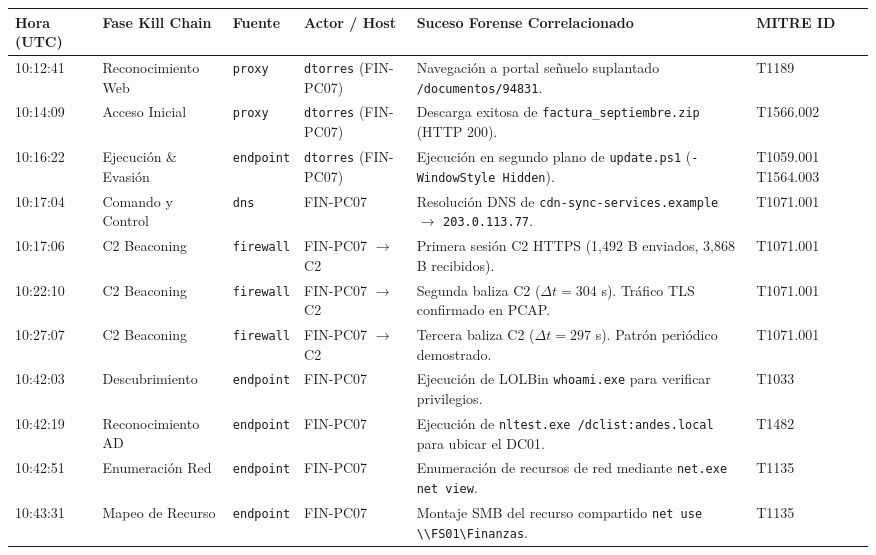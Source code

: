 \documentclass[11pt,a4paper]{article}
\begin{document}
\begin{table}[h!]
\centering
\small
\begin{tabularx}{\textwidth}{l p{2.2cm} l p{3.2cm} X l}
\toprule
\textbf{Hora (UTC)} & \textbf{Fase Kill Chain} & \textbf{Fuente} & \textbf{Actor / Host} & \textbf{Suceso Forense Correlacionado} & \textbf{MITRE ID} \\
\midrule
10:12:41 & Reconocimiento Web & \texttt{proxy} & \texttt{dtorres} (FIN-PC07) & Navegación a portal señuelo suplantado \texttt{/documentos/94831}. & T1189 \\
10:14:09 & Acceso Inicial & \texttt{proxy} & \texttt{dtorres} (FIN-PC07) & Descarga exitosa de \texttt{factura\_septiembre.zip} (HTTP 200). & T1566.002 \\
10:16:22 & Ejecución \& Evasión & \texttt{endpoint} & \texttt{dtorres} (FIN-PC07) & Ejecución en segundo plano de \texttt{update.ps1} (\texttt{-WindowStyle Hidden}). & T1059.001 \newline T1564.003 \\
10:17:04 & Comando y Control & \texttt{dns} & FIN-PC07 & Resolución DNS de \texttt{cdn-sync-services.example} $\rightarrow$ \texttt{203.0.113.77}. & T1071.001 \\
10:17:06 & C2 Beaconing & \texttt{firewall} & FIN-PC07 $\rightarrow$ C2 & Primera sesión C2 HTTPS (1,492 B enviados, 3,868 B recibidos). & T1071.001 \\
10:22:10 & C2 Beaconing & \texttt{firewall} & FIN-PC07 $\rightarrow$ C2 & Segunda baliza C2 ($\Delta t = 304$ s). Tráfico TLS confirmado en PCAP. & T1071.001 \\
10:27:07 & C2 Beaconing & \texttt{firewall} & FIN-PC07 $\rightarrow$ C2 & Tercera baliza C2 ($\Delta t = 297$ s). Patrón periódico demostrado. & T1071.001 \\
10:42:03 & Descubrimiento & \texttt{endpoint} & FIN-PC07 & Ejecución de LOLBin \texttt{whoami.exe} para verificar privilegios. & T1033 \\
10:42:19 & Reconocimiento AD & \texttt{endpoint} & FIN-PC07 & Ejecución de \texttt{nltest.exe /dclist:andes.local} para ubicar el DC01. & T1482 \\
10:42:51 & Enumeración Red & \texttt{endpoint} & FIN-PC07 & Enumeración de recursos de red mediante \texttt{net.exe net view}. & T1135 \\
10:43:31 & Mapeo de Recurso & \texttt{endpoint} & FIN-PC07 & Montaje SMB del recurso compartido \texttt{net use \textbackslash\textbackslash FS01\textbackslash Finanzas}. & T1135 \\

\end{tabularx}
\end{table}
\end{document}
